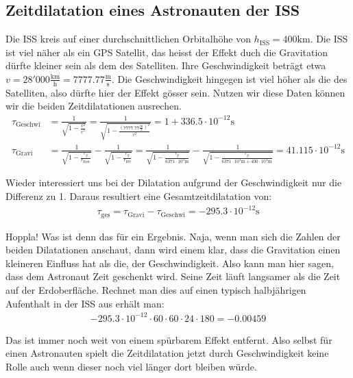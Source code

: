 \begin{refsection}
\subsection{Zeitdilatation eines Astronauten der ISS}
Die ISS kreis auf einer durchschnittlichen Orbitalhöhe von \( h_{\text{ISS}} = 400\text{km} \). Die ISS ist viel näher als ein GPS Satellit, das heisst der Effekt duch die Gravitation dürfte kleiner sein als dem des Satelliten. Ihre Geschwindigkeit beträgt etwa \( v = 28'000\frac{\text{km}}{\text{h}} = 7777.77\frac{\text{m}}{\text{s}} \). Die Geschwindigkeit hingegen ist viel höher als die des Satelliten, also dürfte hier der Effekt gösser sein. Nutzen wir diese Daten können wir die beiden Zeitdilatationen ausrechen.
\begin{align*}
\tau_{\text{Geschwi}} &= \frac{1}{\sqrt{1 - \frac{v^2}{c^2}}} = \frac{1}{\sqrt{1 - \frac{( 7777.77\frac{\text{m}}{\text{s}})^2}{c^2}}} = 1 + 336.5 \cdot 10^{-12}\text{s}
\\
\tau_{\text{Gravi}} &= \frac{1}{\sqrt{1-\frac{r_g}{r_{\text{Erde}}}}} - \frac{1}{\sqrt{1-\frac{r_g}{r_{\text{ISS}}}}} 
= \frac{1}{\sqrt{1-\frac{r_g}{6371 \cdot 10^3\text{m}}}} - \frac{1}{\sqrt{1-\frac{r_g}{6371 \cdot 10^3\text{m} + 400 \cdot 10^3\text{m}}}} = 41.115 \cdot 10^{-12}\text{s}
\end{align*}

\noindent{}Wieder interessiert uns bei der Dilatation aufgrund der Geschwindigkeit nur die Differenz zu 1. Daraus resultiert eine Gesamtzeitdilatation von:
\begin{align*}
\tau_{\text{ges}} = \tau_{\text{Gravi}} - \tau_{\text{Geschwi}} = -295.3 \cdot 10^{-12}\text{s}
\end{align*}

\noindent{}Hoppla! Was ist denn das für ein Ergebnis. Naja, wenn man sich die Zahlen der beiden Dilatationen anschaut, dann wird einem klar, dass die Gravitation einen kleineren Einfluss hat als die, der Geschwindigkeit. Also kann man hier sagen, dass dem Astronaut Zeit geschenkt wird. Seine Zeit läuft langsamer als die Zeit auf der Erdoberfläche. Rechnet man dies auf einen typisch halbjährigen Aufenthalt in der ISS aus erhält man:
\begin{align*}
-295.3 \cdot 10^{-12} \cdot 60 \cdot 60 \cdot 24 \cdot 180 = -0.00459
\end{align*}

\noindent{}Das ist immer noch weit von einem spürbarem Effekt entfernt. Also selbst für einen Astronauten spielt die Zeitdilatation jetzt durch Geschwindigkeit keine Rolle auch wenn dieser noch viel länger dort bleiben würde.


\end{refsection}
